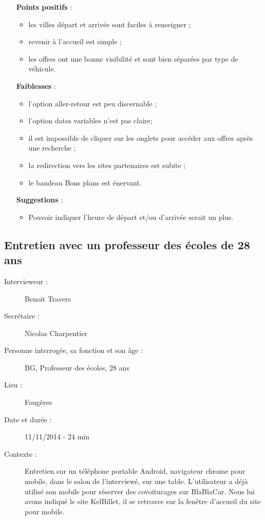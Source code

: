 \begin{itemize}
  \item [\textbf{Points positifs}] :
      \begin{itemize}
        \item les villes d\'{e}part et arriv\'{e}e sont faciles \`{a} renseigner ;
        \item revenir \`{a} l'accueil est simple ;
        \item les offres ont une bonne visibilit\'{e} et sont bien s\'{e}par\'{e}es par type de v\'{e}hicule.
      \end{itemize}
      
  \item [\textbf{Faiblesses}] :
      \begin{itemize}
        \item l'option aller-retour est peu discernable ;
        \item l'option dates variables n'est pas claire;
        \item il est impossible de cliquer sur les onglets pour acc\'{e}der aux offres apr\`{e}s une recherche ;
        \item la redirection vers les sites partenaires est subite ;
        \item le bandeau \og{}Bons plans\fg{} est \'{e}nervant.
      \end{itemize}
      
  \item [\textbf{Suggestions}] :
      \begin{itemize}
      	\item Pouvoir indiquer l'heure de d\'{e}part et/ou d'arriv\'{e}e serait un plus.
      \end{itemize}
\end{itemize}




\subsection{Entretien avec un professeur des \'{e}coles de 28 ans}

\begin{description}
\item [Intervieweur :] Benoit Travers
\item [Secr\'{e}taire :] Nicolas Charpentier
\item [Personne interrog\'{e}e, sa fonction et son \^{a}ge :] BG, Professeur des \'{e}coles, 28 ans
\item [Lieu :] Foug\`{e}res
\item [Date et dur\'{e}e :] 11/11/2014 - 24 min
\item [Contexte :] Entretien sur un t\'{e}l\'{e}phone portable Android, navigateur chrome pour mobile, dans le salon de l'interview\'{e}, sur une table. L'utilisateur a d\'{e}j\`{a} utilis\'{e} son mobile pour r\'{e}server des covoiturages sur BlaBlaCar. Nous lui avons indiqu\'{e} le site KelBillet, il se retrouve sur la fen\^{e}tre d'accueil du site pour mobile.
\end{description}


